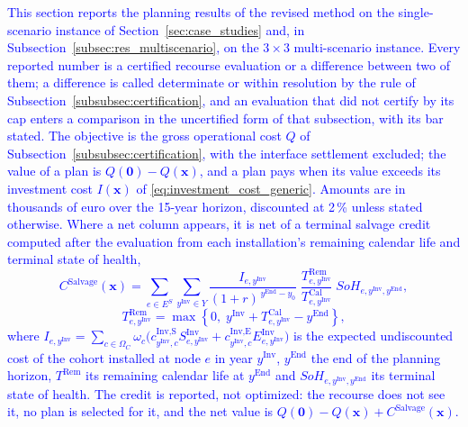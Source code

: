 \textcolor{blue}{
    This section reports the planning results of the revised method on the single-scenario instance of Section~\ref{sec:case_studies} and, in Subsection~\ref{subsec:res_multiscenario}, on the $3 \times 3$ multi-scenario instance. Every reported number is a certified recourse evaluation or a difference between two of them; a difference is called determinate or within resolution by the rule of Subsection~\ref{subsubsec:certification}, and an evaluation that did not certify by its cap enters a comparison in the uncertified form of that subsection, with its bar stated. The objective is the gross operational cost $Q$ of Subsection~\ref{subsubsec:certification}, with the interface settlement excluded; the value of a plan is $Q(\boldsymbol{0}) - Q(\boldsymbol{x})$, and a plan pays when its value exceeds its investment cost $I(\boldsymbol{x})$ of \eqref{eq:investment_cost_generic}. Amounts are in thousands of euro over the 15-year horizon, discounted at 2\,\% unless stated otherwise. Where a net column appears, it is net of a terminal salvage credit computed after the evaluation from each installation's remaining calendar life and terminal state of health,
}
\textcolor{blue}{
    \begin{equation}
        C^\text{Salvage}(\boldsymbol{x}) =
        \sum_{e \in E^S} \sum_{y^\text{Inv} \in Y}
        \frac{I_{e,y^\text{Inv}}}{(1+r)^{\,y^\text{End}-y_0}}
        \;\frac{T^\text{Rem}_{e,y^\text{Inv}}}{T^\text{Cal}_{e,y^\text{Inv}}}
        \; SoH_{e,y^\text{Inv},y^\text{End}},
        \label{eq:salvage_credit}
    \end{equation}
    \begin{equation}
        T^\text{Rem}_{e,y^\text{Inv}} = \max\left\{0,\; y^\text{Inv} + T^\text{Cal}_{e,y^\text{Inv}} - y^\text{End}\right\},
        \label{eq:salvage_remaining_life}
    \end{equation}
}
\textcolor{blue}{
    where $I_{e,y^\text{Inv}} = \sum_{c \in \Omega_C} \omega_c \big( c^{\text{Inv,S}}_{y^\text{Inv},c} S^{\text{Inv}}_{e,y^\text{Inv}} + c^{\text{Inv,E}}_{y^\text{Inv},c} E^{\text{Inv}}_{e,y^\text{Inv}} \big)$ is the expected undiscounted cost of the cohort installed at node $e$ in year $y^\text{Inv}$, $y^\text{End}$ the end of the planning horizon, $T^\text{Rem}$ its remaining calendar life at $y^\text{End}$ and $SoH_{e,y^\text{Inv},y^\text{End}}$ its terminal state of health. The credit is reported, not optimized: the recourse does not see it, no plan is selected for it, and the net value is $Q(\boldsymbol{0}) - Q(\boldsymbol{x}) + C^\text{Salvage}(\boldsymbol{x})$.
}

